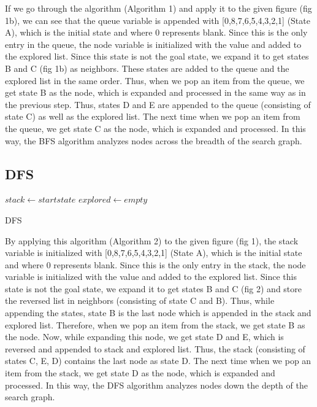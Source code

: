\documentclass{svproc}
\begin{document}
\noindent If we go through the algorithm (Algorithm 1) and apply it to the given figure (fig 1b), we can see that the queue variable is appended with [0,8,7,6,5,4,3,2,1] (State A), which is the initial state and where 0 represents blank. Since this is the only entry in the queue, the node variable is initialized with the value and added to the explored list. Since this state is not the goal state, we expand it to get states B and C (fig 1b) as neighbors. These states are added to the queue and the explored list in the same order. Thus, when we pop an item from the queue, we get state B as the node, which is expanded and processed in the same way as in the previous step. Thus, states D and E are appended to the queue (consisting of state C) as well as the explored list. The next time when we pop an item from the queue, we get state C as the node, which is expanded and processed. In this way, the BFS algorithm analyzes nodes across the breadth of the search graph.
\subsection{DFS}
\setlength{\intextsep}{2pt}
\begin{algorithm}
	\SetAlgoLined
	$stack \gets start state$\;
	$explored \gets empty$\;
	\caption{DFS}
\end{algorithm}
\noindent By applying this algorithm (Algorithm 2) to the given figure (fig 1), the stack variable is initialized with [0,8,7,6,5,4,3,2,1] (State A), which is the initial state and where 0 represents blank. Since this is the only entry in the stack, the node variable is initialized with the value and added to the explored list. Since this state is not the goal state, we expand it to get states B and C (fig 2) and store the reversed list in neighbors (consisting of state C and B). Thus, while appending the states, state B is the last node which is appended in the stack and explored list. Therefore, when we pop an item from the stack, we get state B as the node. Now, while expanding this node, we get state D and E, which is reversed and appended to stack and explored list. Thus, the stack (consisting of states C, E, D) contains the last node as state D. The next time when we pop an item from the stack, we get state D as the node, which is expanded and processed. In this way, the DFS algorithm analyzes nodes down the depth of the search graph. 
\end{document}
